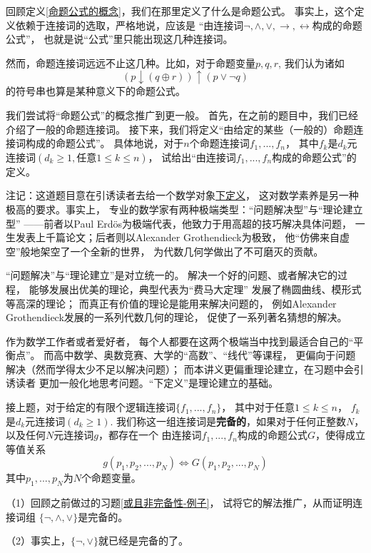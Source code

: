 \begin{prob}[关于命题公式]
回顾定义\ref{命题公式的概念}，我们在那里定义了什么是命题公式。
事实上，这个定义依赖于连接词的选取，严格地说，应该是
“由连接词$\neg,\wedge,\vee,
\rightarrow,\leftrightarrow$构成的命题公式”，
也就是说“公式”里只能出现这几种连接词。

然而，命题连接词远远不止这几种。比如，对于命题变量$p,q,r$,
我们认为诸如
$$(p\downarrow(q\oplus r))\uparrow(p\vee\neg q)$$
的符号串也算是某种意义下的命题公式。

我们尝试将“命题公式”的概念推广到更一般。
首先，在之前的题目中，我们已经介绍了一般的命题连接词。
接下来，我们将定义“由给定的某些（一般的）命题连接词构成的命题公式”。
具体地说，对于$n$个命题连接词$f_1,...,f_n$，
其中$f_k$是$d_k$元连接词$(d_k\geq 1,\text{任意}1\leq k\leq n)$，
试给出“由连接词$f_1,...,f_n$构成的命题公式”的定义。
\end{prob}

注记：这道题目意在引诱读者去给一个数学对象\underline{下定义}，
这对数学素养是另一种极高的要求。事实上，
专业的数学家有两种极端类型：“问题解决型”与“理论建立型”
——前者以Paul Erd\"{o}s为极端代表，他致力于用高超的技巧解决具体问题，
一生发表上千篇论文；后者则以Alexander Grothendieck为极致，
他“仿佛来自虚空”般地架空了一个全新的世界，
为代数几何学做出了不可磨灭的贡献。

“问题解决”与“理论建立”是对立统一的。
解决一个好的问题、或者解决它的过程，
能够发展出优美的理论，典型代表为“费马大定理”
发展了椭圆曲线、模形式等高深的理论；
而真正有价值的理论是能用来解决问题的，
例如Alexander Grothendieck发展的一系列代数几何的理论，
促使了一系列著名猜想的解决。

作为数学工作者或者爱好者，
每个人都要在这两个极端当中找到最适合自己的“平衡点”。
而高中数学、奥数竞赛、大学的“高数”、“线代”等课程，
更偏向于问题解决（然而学得太少不足以解决问题）；
而本讲义更偏重理论建立，在习题中会引诱读者
更加一般化地思考问题。“下定义”是理论建立的基础。\vs

\begin{prob}[完备连接词组]
接上题，对于给定的有限个逻辑连接词$\{f_1,...,f_n\}$，
其中对于任意$1\leq k\leq n$，
$f_k$是$d_k$元连接词$(d_k\geq 1)$.
我们称这一组连接词是\textbf{完备的}，如果对于任何正整数$N$，
以及任何$N$元连接词$g$，都存在一个
由连接词$f_1,...,f_n$构成的命题公式$G$，使得成立等值关系
$$g(p_1,p_2,...,p_N)\Leftrightarrow G(p_1,p_2,...,p_N)$$
其中$p_1,...,p_N$为$N$个命题变量。

（1）回顾之前做过的习题\ref{或且非完备性-例子}，
试将它的解法推广，从而证明连接词组
$\{\neg,\wedge,\vee\}$是完备的。

（2）事实上，$\{\neg,\vee\}$就已经是完备的了。
\end{prob}

